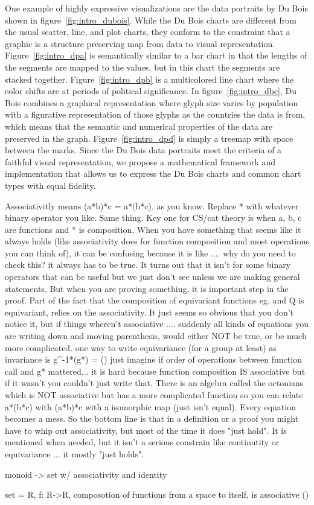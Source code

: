 One example of highly expressive visualizations are the data portraits by Du Bois shown in figure~\ref{fig:intro_dubois}. While the Du Bois charts are different from the usual scatter, line, and plot charts, they conform to the constraint that a graphic is a structure preserving map from data to visual representation. Figure~\ref{fig:intro_dpa} is semantically similar to a bar chart in that the lengths of the segments are mapped to the values, but in this chart the segments are stacked together. Figure~\ref{fig:intro_dpb} is a multicolored line chart where the color shifts are at periods of political significance. In figure~\ref{fig:intro_dbc}, Du Bois combines a graphical representation where glyph size varies by population with a figurative representation of those glyphs as the countries the data is from, which means that the semantic and numerical properties of the data are preserved in the graph. Figure~\ref{fig:intro_dpd} is simply a treemap\cite{heerTourVisualizationZoo2010} with space between the marks. Since the Du Bois data portraits meet the criteria of a faithful visual representation, we propose a mathematical framework and implementation that allows us to express the Du Bois charts and common chart types with equal fidelity. 


Associativitly means (a*b)*c = a*(b*c), as you know. Replace * with whatever binary operator you like. Same thing. Key one for CS/cat theory is when a, b, c are functions and * is composition. When you have something that seems like it always holds (like associativity does for function composition and most operations you can think of), it can be confusing because it is like .... why do you need to check this? it always has to be true.
It turns out that it isn't for some binary operators that can be useful but we just don't see unless we are making general statements.
But when you are proving something, it is important step in the proof.
Part of the fact that the composition of equivariant functions eg. \nu and Q is equivariant, relies on the associativity. It just seems so obvious that you don't notice it, but if things wheren't associative .... suddenly all kinds of equations you are writing down and moving parenthesis, would either NOT be true, or be much more complicated.
one way to write equivariance (for a group at least) as invariance is
g^-1*\nu(g*\tau) = \nu(\tau)
just imagine if order of operations between function call and g* mattered... it is hard because function composition IS associative but if it wasn't you couldn't just write that.
There is an algebra called the octonians which is NOT associative but has a more complicated function so you can relate a*(b*c) with (a*b)*c with a isomorphic map (just isn't equal). Every equation becomes a mess. So the bottom line is that in a definition or a proof you might have to whip out associativity, but most of the time it does "just hold". It is mentioned when needed, but it isn't a serious constrain like continutity or equivariance ... it mostly "just holds".

monoid -> set w/ associativity and identity

set = R, f: R->R, 
composotion of functions from a space to itself, is associative (\compo)